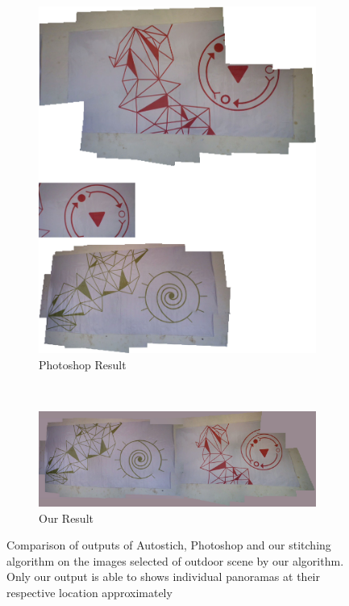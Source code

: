 \begin{figure}
\begin{subfigure}[b]{0.45\textwidth}
\includegraphics[width=\linewidth]{figures/green_red/photoshop_output.jpg}
\caption{Photoshop Result}
\end{subfigure}\\
\begin{subfigure}[b]{\textwidth}
\includegraphics[width=\linewidth]{figures/green_red/our_result.jpg}
\caption{Our Result}
\end{subfigure}
\caption{Comparison of outputs of Autostich, Photoshop and our stitching
algorithm on the images selected of outdoor scene by our algorithm. Only our
output is able to shows individual panoramas at their respective location
approximately}
\label{fig:green_red_comparison}
\end{figure}

